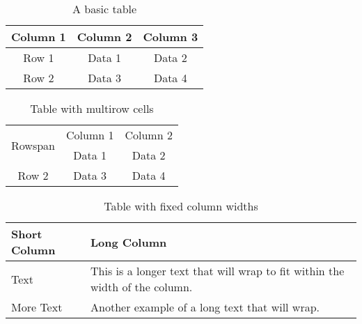 
\begin{table}[h]                                    %
    \centering
    \begin{tabular}{|c|c|c|}                        %
        \hline
        Column 1 & Column 2 & Column 3 \\ \hline
        Row 1    & Data 1   & Data 2   \\ \hline
        Row 2    & Data 3   & Data 4   \\ \hline
    \end{tabular}
    \caption{A basic table}
    \label{tab:basic}
\end{table}




\begin{table}[h]
    \centering
    \begin{tabular}{|c|c|c|}
        \hline
        \multirow{2}{*}{Rowspan} & Column 1 & Column 2 \\ \cline{2-3}
                                 & Data 1   & Data 2   \\ \hline
        Row 2                    & Data 3   & Data 4   \\ \hline
    \end{tabular}
    \caption{Table with multirow cells}
    \label{tab:multirow}
\end{table}





\begin{table}[h]
    \centering
    \begin{tabular}{|p{3cm}|p{5cm}|}
        \hline
        Short Column & Long Column                                                                 \\ \hline
        Text         & This is a longer text that will wrap to fit within the width of the column. \\ \hline
        More Text    & Another example of a long text that will wrap.                              \\ \hline
    \end{tabular}
    \caption{Table with fixed column widths}
    \label{tab:fixedwidth}
\end{table}

